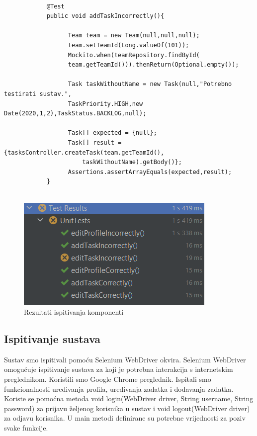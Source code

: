 		\begin{verbatim}
			
			@Test
			public void addTaskIncorrectly(){
				  
				  Team team = new Team(null,null,null);
				  team.setTeamId(Long.valueOf(101));
				  Mockito.when(teamRepository.findById(
				  team.getTeamId())).thenReturn(Optional.empty());
				
				  Task taskWithoutName = new Task(null,"Potrebno testirati sustav.",
				  TaskPriority.HIGH,new    Date(2020,1,2),TaskStatus.BACKLOG,null);
				
				  Task[] expected = {null};
				  Task[] result = {tasksController.createTask(team.getTeamId(),
					  taskWithoutName).getBody()};
				  Assertions.assertArrayEquals(expected,result);
			}
			
		\end{verbatim}
		\begin{figure}[H] 
			\includegraphics[width=\textwidth]{slike/unitTestRezultati.png}
			\caption{Rezultati ispitivanja komponenti}
		\end{figure}
		
		
		
		
		
		
		
		
		
		
		\subsection{Ispitivanje sustava}
		
		Sustav smo ispitivali pomoću Selenium WebDriver okvira. Selenium WebDriver omogućuje ispitivanje sustava za koji je potrebna interakcija s internetskim preglednikom. Koristili smo Google Chrome preglednik. Ispitali smo funkcionalnosti uređivanja profila, uređivanja zadatka i dodavanja zadatka. Koriste se pomoćna metoda void login(WebDriver driver, String username, String password) za prijavu željenog korisnika u sustav i void logout(WebDriver driver) za odjavu korisnika. U main metodi definirane su potrebne vrijednosti za poziv svake funkcije.
		
